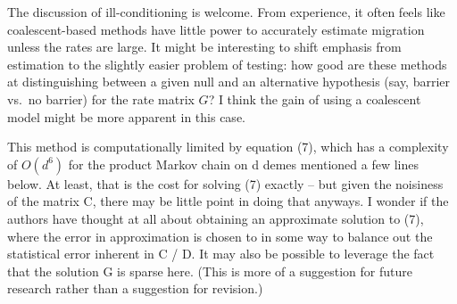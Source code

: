 
\begin{point}{}
    The discussion of ill-conditioning is welcome. From experience, it often
    feels like coalescent-based methods have little power to accurately
    estimate migration unless the rates are large. It might be interesting to
    shift emphasis from estimation to the slightly easier problem of testing:
    how good are these methods at distinguishing between a given null and an
    alternative hypothesis (say, barrier vs.\ no barrier) for the rate matrix $G$?
    I think the gain of using a coalescent model might be more apparent in this case.
\end{point}


\begin{point}{}
    This method is computationally limited by equation (7), which has a
    complexity of $O(d^6)$ for the product Markov chain on d demes mentioned a
    few lines below. At least, that is the cost for solving (7) exactly -- but
    given the noisiness of the matrix C, there may be little point in doing
    that anyways. I wonder if the authors have thought at all about obtaining
    an approximate solution to (7), where the error in approximation is chosen
    to in some way to balance out the statistical error inherent in C / D. It
    may also be possible to leverage the fact that the solution G is sparse
    here.  (This is more of a suggestion for future research rather than a
    suggestion for revision.)
\end{point}


